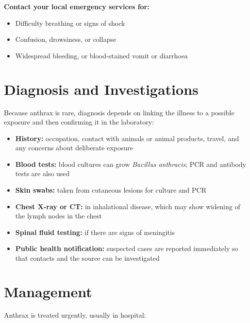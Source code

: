 \textbf{Contact your local emergency services for:}
\begin{itemize}
    \item Difficulty breathing or signs of shock
    \item Confusion, drowsiness, or collapse
    \item Widespread bleeding, or blood-stained vomit or diarrhoea
\end{itemize}

\section*{Diagnosis and Investigations}
Because anthrax is rare, diagnosis depends on linking the illness to a possible exposure and then confirming it in the laboratory:

\begin{itemize}
    \item \textbf{History:} occupation, contact with animals or animal products, travel, and any concerns about deliberate exposure
    \item \textbf{Blood tests:} blood cultures can grow \textit{Bacillus anthracis}; PCR and antibody tests are also used
    \item \textbf{Skin swabs:} taken from cutaneous lesions for culture and PCR
    \item \textbf{Chest X-ray or CT:} in inhalational disease, which may show widening of the lymph nodes in the chest
    \item \textbf{Spinal fluid testing:} if there are signs of meningitis
    \item \textbf{Public health notification:} suspected cases are reported immediately so that contacts and the source can be investigated
\end{itemize}

\section*{Management}
Anthrax is treated urgently, usually in hospital:

